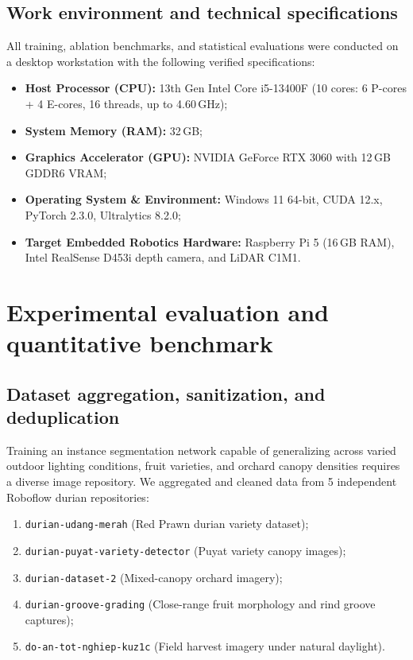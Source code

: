 \documentclass[12pt,a4paper]{article}
\begin{document}
\subsection{Work environment and technical specifications}
All training, ablation benchmarks, and statistical evaluations were conducted on a desktop workstation with the following verified specifications:
\begin{itemize}
    \item \textbf{Host Processor (CPU):} 13th Gen Intel Core i5-13400F (10 cores: 6 P-cores + 4 E-cores, 16 threads, up to 4.60\,GHz);
    \item \textbf{System Memory (RAM):} 32\,GB;
    \item \textbf{Graphics Accelerator (GPU):} NVIDIA GeForce RTX 3060 with 12\,GB GDDR6 VRAM;
    \item \textbf{Operating System \& Environment:} Windows 11 64-bit, CUDA 12.x, PyTorch 2.3.0, Ultralytics 8.2.0;
    \item \textbf{Target Embedded Robotics Hardware:} Raspberry Pi 5 (16\,GB RAM), Intel RealSense D453i depth camera, and LiDAR C1M1.
\end{itemize}

\section{Experimental evaluation and quantitative benchmark}

\subsection{Dataset aggregation, sanitization, and deduplication}
Training an instance segmentation network capable of generalizing across varied outdoor lighting conditions, fruit varieties, and orchard canopy densities requires a diverse image repository. We aggregated and cleaned data from 5 independent Roboflow durian repositories:
\begin{enumerate}
    \item \texttt{durian-udang-merah} (Red Prawn durian variety dataset);
    \item \texttt{durian-puyat-variety-detector} (Puyat variety canopy images);
    \item \texttt{durian-dataset-2} (Mixed-canopy orchard imagery);
    \item \texttt{durian-groove-grading} (Close-range fruit morphology and rind groove captures);
    \item \texttt{do-an-tot-nghiep-kuz1c} (Field harvest imagery under natural daylight).
\end{enumerate}
\end{document}

